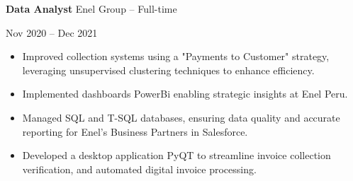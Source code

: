 \documentclass[10pt, letterpaper]{article}
\newenvironment{highlights}{
    \begin{itemize}[
        topsep=0.10 cm,
        parsep=0.10 cm,
        partopsep=0pt,
        itemsep=0pt,
        leftmargin=0 cm + 10pt
    ]
}{
    \end{itemize}
} %
\newenvironment{twocolentry}[2][]{
    \onecolentry
    \def\secondColumn{#2}
    \setcolumnwidth{\fill, 4.5 cm}
    \begin{paracol}{2}
}{
    \switchcolumn \raggedleft \secondColumn
    \end{paracol}
    \endonecolentry
} %
\begin{document}
\begin{twocolentry}{Nov 2020 – Dec 2021}
    \textbf{Data Analyst} \textbar Enel Group – Full-time
\end{twocolentry}
\begin{highlights}
    \item Improved collection systems using a "Payments to Customer" strategy, leveraging unsupervised clustering techniques to enhance efficiency.
    \item Implemented dashboards PowerBi enabling strategic insights at Enel Peru.
    \item Managed SQL and T-SQL databases, ensuring data quality and accurate reporting for Enel's Business Partners in Salesforce.
    \item Developed a desktop application PyQT to streamline invoice collection verification, and automated digital invoice processing.
\end{highlights}

\vspace{0.3cm}
\end{document}
